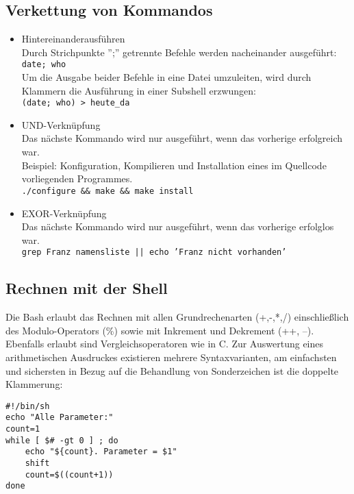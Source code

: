 \documentclass[11pt]{article}
\begin{document}
\subsection{Verkettung von Kommandos}
\begin{itemize}
\item{Hintereinanderausführen}\\
Durch Strichpunkte '';'' getrennte Befehle werden nacheinander
ausgeführt:\\
\texttt{date; who}\\
Um die Ausgabe beider Befehle in eine Datei umzuleiten, wird durch
Klammern die Ausführung in einer Subshell erzwungen:\\ 
\texttt{(date; who) >  heute\_da}\\

\item{UND-Verknüpfung}\\
Das nächste Kommando wird nur ausgeführt, wenn das vorherige erfolgreich war.\\
Beispiel: Konfiguration, Kompilieren und Installation eines im Quellcode 
vorliegenden Programmes.\\
\texttt{./configure \&\& make \&\& make install}\\

\item{EXOR-Verknüpfung}\\
Das nächste Kommando wird nur ausgeführt, wenn das vorherige erfolglos war.\\
\texttt{grep Franz namensliste  || echo 'Franz nicht vorhanden'}\\
\end{itemize}

\subsection{Rechnen mit der Shell}
Die Bash erlaubt das Rechnen mit allen Grundrechenarten (+,-,*,/)
einschließlich des Modulo-Operators (\%) sowie mit Inkrement und 
Dekrement (++, --). Ebenfalls erlaubt sind Vergleichsoperatoren wie in C. Zur
Auswertung eines arithmetischen Ausdruckes existieren mehrere
Syntaxvarianten, am einfachsten und sichersten in Bezug auf die 
Behandlung von Sonderzeichen ist die doppelte Klammerung:

\begin{verbatim}
#!/bin/sh
echo "Alle Parameter:"
count=1
while [ $# -gt 0 ] ; do
	echo "${count}. Parameter = $1"
	shift
	count=$((count+1))
done
\end{verbatim}
\end{document}
